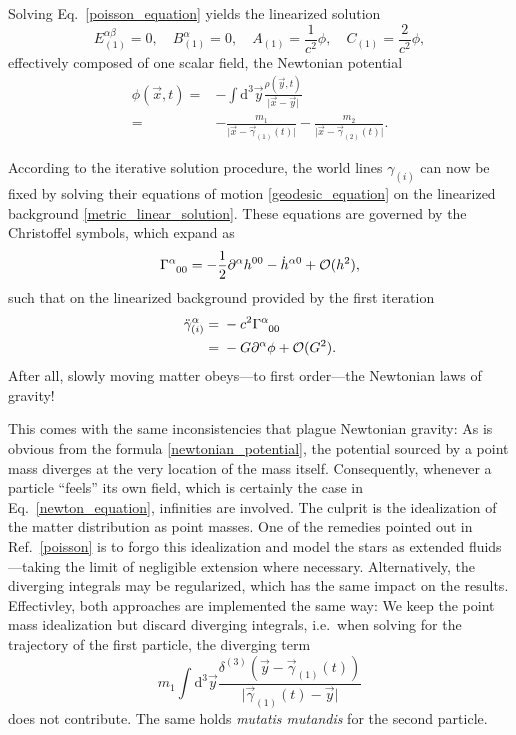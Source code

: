 Solving Eq.~\eqref{poisson_equation} yields the linearized solution
\begin{equation}\label{metric_linear_solution}
  E^{\alpha\beta}_{(1)} = 0,\quad B^\alpha_{(1)} = 0,\quad A_{(1)} = \frac{1}{c^2}\phi,\quad C_{(1)} = \frac{2}{c^2} \phi,
\end{equation}
effectively composed of one scalar field, the Newtonian potential
\begin{equation}\label{newtonian_potential}
  \begin{aligned}
    \phi(\vec x,t) = {} & - \int \mathrm d^3\vec y\frac{\rho(\vec y,t)}{\lvert\vec x-\vec y\rvert} \\
    = {} & - \frac{m_1}{\lvert\vec x-\vec\gamma_{(1)}(t)\rvert} - \frac{m_2}{\lvert\vec x-\vec\gamma_{(2)}(t)\rvert}.
  \end{aligned}
\end{equation}

According to the iterative solution procedure, the world lines $\gamma_{(i)}$ can now be fixed by solving their equations of motion \eqref{geodesic_equation} on the linearized background \eqref{metric_linear_solution}. These equations are governed by the Christoffel symbols, which expand as
\begin{equation}
  \Gamma^\alpha_{\hphantom\alpha 00} = -\frac{1}{2}\partial^\alpha h^{00} - \dot h^{\alpha 0} + \mathcal O(h^2),
\end{equation}
such that on the linearized background provided by the first iteration
\begin{equation}\label{newton_equation}
  \begin{aligned}
    \ddot \gamma^\alpha_{(i)} = {} & - c^2 \Gamma^\alpha_{\hphantom\alpha 00} \\
    = {} & -G \partial^\alpha \phi + \mathcal O(G^2).
  \end{aligned}
\end{equation}
After all, slowly moving matter obeys---to first order---the Newtonian laws of gravity!

This comes with the same inconsistencies that plague Newtonian gravity: As is obvious from the formula \eqref{newtonian_potential}, the potential sourced by a point mass diverges at the very location of the mass itself. Consequently, whenever a particle ``feels'' its own field, which is certainly the case in Eq.~\eqref{newton_equation}, infinities are involved. The culprit is the idealization of the matter distribution as point masses. One of the remedies pointed out in Ref.~\ref{poisson} is to forgo this idealization and model the stars as extended fluids---taking the limit of negligible extension where necessary. Alternatively, the diverging integrals may be regularized, which has the same impact on the results. Effectivley, both approaches are implemented the same way: We keep the point mass idealization but discard diverging integrals, i.e.~when solving for the trajectory of the first particle, the diverging term
\begin{equation}
  m_1 \int\mathrm d^3\vec y \frac{\delta^{(3)}(\vec y - \vec\gamma_{(1)}(t))}{\lvert\vec\gamma_{(1)}(t) - \vec y\rvert}
\end{equation}
does not contribute. The same holds \emph{mutatis mutandis} for the second particle.

